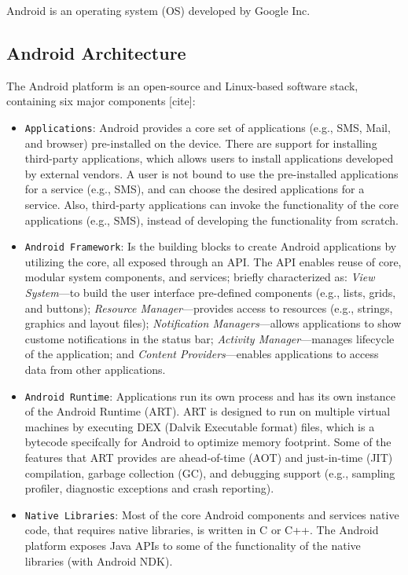 Android is an operating system (OS) developed by Google Inc.


\subsection{Android Architecture}
The Android platform is an open-source and Linux-based software stack, containing six major components [cite]: 

\begin{itemize}
    \item \verb|Applications|: Android provides a core set of applications (e.g., SMS, Mail, and browser) pre-installed on the device. There are support for installing third-party applications, which allows users to install applications developed by external vendors. A user is not bound to use the pre-installed applications for a service (e.g., SMS), and can choose the desired applications for a service. Also, third-party applications can invoke the functionality of the core applications (e.g., SMS), instead of developing the functionality from scratch. 
    \item \verb|Android Framework|: Is the building blocks to create Android applications by utilizing the core, all exposed through an API. The API enables reuse of core, modular system components, and services; briefly characterized as: \textit{View System}---to build the user interface pre-defined components (e.g., lists, grids, and buttons); \textit{Resource Manager}---provides access to resources (e.g., strings, graphics and layout files); \textit{Notification Managers}---allows applications to show custome notifications in the status bar; \textit{Activity Manager}---manages lifecycle of the application; and \textit{Content Providers}---enables applications to access data from other applications.
    \item \verb|Android Runtime|: Applications run its own process and has its own instance of the Android Runtime (ART). ART is designed to run on multiple virtual machines by executing DEX (Dalvik Executable format) files, which is a bytecode specifcally for Android to optimize memory footprint. Some of the features that ART provides are ahead-of-time (AOT) and just-in-time (JIT) compilation, garbage collection (GC), and debugging support (e.g., sampling profiler, diagnostic exceptions and crash reporting).
    \item \verb|Native Libraries|: Most of the core Android components and services native code, that requires native libraries, is written in C or C++. The Android platform exposes Java APIs to some of the functionality of the native libraries (with Android NDK).   

\end{itemize}
